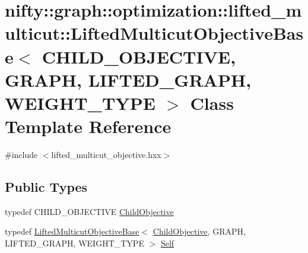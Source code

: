 \hypertarget{classnifty_1_1graph_1_1optimization_1_1lifted__multicut_1_1LiftedMulticutObjectiveBase}{}\section{nifty\+:\+:graph\+:\+:optimization\+:\+:lifted\+\_\+multicut\+:\+:Lifted\+Multicut\+Objective\+Base$<$ C\+H\+I\+L\+D\+\_\+\+O\+B\+J\+E\+C\+T\+I\+V\+E, G\+R\+A\+P\+H, L\+I\+F\+T\+E\+D\+\_\+\+G\+R\+A\+P\+H, W\+E\+I\+G\+H\+T\+\_\+\+T\+Y\+P\+E $>$ Class Template Reference}
\label{classnifty_1_1graph_1_1optimization_1_1lifted__multicut_1_1LiftedMulticutObjectiveBase}


{\ttfamily \#include $<$lifted\+\_\+multicut\+\_\+objective.\+hxx$>$}

\subsection*{Public Types}
\begin{DoxyCompactItemize}
\item 
typedef C\+H\+I\+L\+D\+\_\+\+O\+B\+J\+E\+C\+T\+I\+V\+E \hyperlink{classnifty_1_1graph_1_1optimization_1_1lifted__multicut_1_1LiftedMulticutObjectiveBase_a51016bc6ef6d544846dd8e201f27c132}{Child\+Objective}
\item 
typedef \hyperlink{classnifty_1_1graph_1_1optimization_1_1lifted__multicut_1_1LiftedMulticutObjectiveBase}{Lifted\+Multicut\+Objective\+Base}$<$ \hyperlink{classnifty_1_1graph_1_1optimization_1_1lifted__multicut_1_1LiftedMulticutObjectiveBase_a51016bc6ef6d544846dd8e201f27c132}{Child\+Objective}, G\+R\+A\+P\+H, L\+I\+F\+T\+E\+D\+\_\+\+G\+R\+A\+P\+H, W\+E\+I\+G\+H\+T\+\_\+\+T\+Y\+P\+E $>$ \hyperlink{classnifty_1_1graph_1_1optimization_1_1lifted__multicut_1_1LiftedMulticutObjectiveBase_a103f0e557ebe2c8f86c07ee1a7aeeb5b}{Self}
\end{DoxyCompactItemize}
